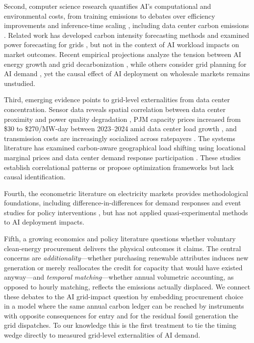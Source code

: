 \documentclass[a4paper,fleqn,longmktitle]{cas-sc}
\theoremstyle{plain}
\theoremstyle{definition}
\begin{document}
Second, computer science research quantifies AI's computational and environmental costs, from training emissions \cite{strubell19, schwartz2020green} to debates over efficiency improvements \cite{RN2, RN8} and inference-time scaling \cite{kim2025cost}, including data center carbon emissions \cite{datacenter-carbon}. Related work has developed carbon intensity forecasting methods \cite{maji2022dacf, li2023gnn} and examined power forecasting for grids \cite{optimizing-grid, carbon-intensity-forecasting}, but not in the context of AI workload impacts on market outcomes. Recent empirical projections analyze the tension between AI energy growth and grid decarbonization \cite{maji2024crossroads}, while others consider grid planning for AI demand \cite{ai-grid-planning}, yet the causal effect of AI deployment on wholesale markets remains unstudied.

Third, emerging evidence points to grid-level externalities from data center concentration. Sensor data reveals spatial correlation between data center proximity and power quality degradation \cite{nicoletti2024}, PJM capacity prices increased from \$30 to \$270/MW-day between 2023--2024 amid data center load growth \cite{cmu2025}, and transmission costs are increasingly socialized across ratepayers \cite{jacobs2025}. The systems literature has examined carbon-aware geographical load shifting using locational marginal prices \cite{lindberg2021guide} and data center demand response participation \cite{chen2019datacenter, liu2014pricing, klingert2018mapping}. These studies establish correlational patterns or propose optimization frameworks but lack causal identification.

Fourth, the econometric literature on electricity markets provides methodological foundations, including difference-in-differences for demand responses \cite{roth2024did} and event studies for policy interventions \cite{pnnl2022}, but has not applied quasi-experimental methods to AI deployment impacts.

Fifth, a growing economics and policy literature questions whether voluntary clean-energy procurement delivers the physical outcomes it claims. The central concerns are \emph{additionality}---whether purchasing renewable attributes induces new generation or merely reallocates the credit for capacity that would have existed anyway---and \emph{temporal matching}---whether annual volumetric accounting, as opposed to hourly matching, reflects the emissions actually displaced. We connect these debates to the AI grid-impact question by embedding procurement choice in a model where the same annual carbon ledger can be reached by instruments with opposite consequences for entry and for the residual fossil generation the grid dispatches. To our knowledge this is the first treatment to tie the timing wedge directly to measured grid-level externalities of AI demand.
\end{document}
